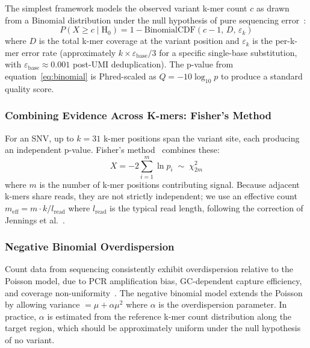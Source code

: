 The simplest framework models the observed variant k-mer count $c$ as drawn
from a Binomial distribution under the null hypothesis of pure sequencing
error~\cite{wei2011snver,koboldt2016statistical}:
\begin{equation}
  P(X \geq c \mid \text{H}_0) = 1 - \mathrm{BinomialCDF}(c - 1,\, D,\, \varepsilon_k)
  \label{eq:binomial}
\end{equation}
where $D$ is the total k-mer coverage at the variant position and $\varepsilon_k$
is the per-k-mer error rate (approximately $k \times \varepsilon_{\text{base}} / 3$
for a specific single-base substitution, with $\varepsilon_{\text{base}} \approx 0.001$
post-UMI deduplication).  The p-value from equation~\eqref{eq:binomial} is
Phred-scaled as $Q = -10 \log_{10} p$ to produce a standard quality score.

\subsubsection{Combining Evidence Across K-mers: Fisher's Method}

For an SNV, up to $k = 31$ k-mer positions span the variant site, each
producing an independent p-value.  Fisher's method~\cite{fisher1925statistical}
combines these:
\begin{equation}
  X = -2 \sum_{i=1}^{m} \ln p_i \;\sim\; \chi^2_{2m}
  \label{eq:fisher}
\end{equation}
where $m$ is the number of k-mer positions contributing signal.  Because
adjacent k-mers share reads, they are not strictly independent; we use an
effective count $m_{\text{eff}} = m \cdot k / l_{\text{read}}$ where
$l_{\text{read}}$ is the typical read length, following the correction of
Jennings et al.~\cite{jennings2017assessing}.

\subsubsection{Negative Binomial Overdispersion}

Count data from sequencing consistently exhibit overdispersion relative to the
Poisson model, due to PCR amplification bias, GC-dependent capture efficiency,
and coverage non-uniformity~\cite{love2014deseq2}.  The negative binomial model
extends the Poisson by allowing variance $= \mu + \alpha\mu^2$ where $\alpha$ is
the overdispersion parameter.  In practice, $\alpha$ is estimated from the
reference k-mer count distribution along the target region, which should be
approximately uniform under the null hypothesis of no variant.

